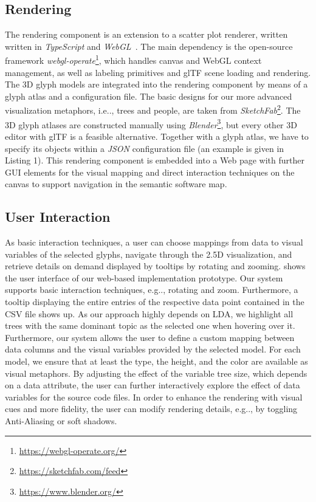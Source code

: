 \documentclass[runningheads]{llncs}
\makeatletter
\DeclareRobustCommand\onedot{\futurelet\@let@token\@onedot}
\def\@onedot{\ifx\@let@token.\else.\null\fi\xspace}
\def\eg{e.g\onedot,\xspace}
\def\ie{i.e\onedot,\xspace}
\makeatother
\begin{document}
\subsection{Rendering}
The rendering component is an extension to a scatter plot renderer, written written in \textit{TypeScript} and \textit{WebGL}~\cite{wagner2020-scatterplot}.
The main dependency is the open-source framework \textit{webgl-operate}\footnote{\href{https://webgl-operate.org/}{https://webgl-operate.org/}}, which handles canvas and WebGL context management, as well as labeling primitives and glTF scene loading and rendering.
The 3D glyph models are integrated into the rendering component by means of a glyph atlas and a configuration file.
The basic designs for our more advanced visualization metaphors, \ie trees and people, are taken from \textit{SketchFab}\footnote{\href{https://sketchfab.com/feed}{https://sketchfab.com/feed}}.
The 3D glyph atlases are constructed manually using \textit{Blender}\footnote{\href{https://www.blender.org/}{https://www.blender.org/}}, but every other 3D editor with glTF is a feasible alternative.
Together with a glyph atlas, we have to specify its objects within a \textit{JSON} configuration file (an example is given in Listing 1). %
This rendering component is embedded into a Web page with further GUI elements for the visual mapping and direct interaction techniques on the canvas to support navigation in the semantic software map.

\subsection{User Interaction}
As basic interaction techniques, a user can choose mappings from data to visual variables of the selected glyphs, navigate through the 2.5D visualization, and retrieve details on demand displayed by tooltips by rotating and zooming.
 shows the user interface of our web-based implementation prototype.
Our system supports basic interaction techniques, \eg rotating and zoom.
Furthermore, a tooltip displaying the entire entries of the respective data point contained in the CSV file shows up.
As our approach highly depends on \ac{LDA}, we highlight all trees with the same dominant topic as the selected one when hovering over it.
Furthermore, our system allows the user to define a custom mapping between data columns and the visual variables provided by the selected model.
For each model, we ensure that at least the type, the height, and the color are available as visual metaphors.
By adjusting the effect of the variable tree size, which depends on a data attribute, the user can further interactively explore the effect of data variables for the source code files.
In order to enhance the rendering with visual cues and more fidelity, the user can modify rendering details, \eg by toggling Anti-Aliasing or soft shadows.
\end{document}
